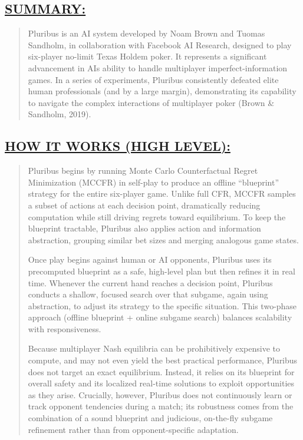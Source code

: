 \documentclass[
]{article}
\begin{document}
\subsection*{\texorpdfstring{\textbf{\ul{SUMMARY:}}}{SUMMARY:}}\label{summary-1}

\begin{quote}
Pluribus is an AI system developed by Noam Brown and Tuomas Sandholm, in
collaboration with Facebook AI Research, designed to play six-player
no-limit Texas Hold\textquotesingle em poker. It represents a
significant advancement in AI\textquotesingle s ability to handle
multiplayer imperfect-information games. In a series of experiments,
Pluribus consistently defeated elite human professionals (and by a large
margin), demonstrating its capability to navigate the complex
interactions of multiplayer poker (Brown \& Sandholm, 2019).
\end{quote}

\subsection*{\texorpdfstring{\textbf{\ul{HOW IT WORKS (HIGH
LEVEL):}}}{HOW IT WORKS (HIGH LEVEL):}}\label{how-it-works-high-level-1}

\begin{quote}
Pluribus begins by running Monte Carlo Counterfactual Regret
Minimization (MCCFR) in self-play to produce an offline ``blueprint''
strategy for the entire six-player game. Unlike full CFR, MCCFR samples
a subset of actions at each decision point, dramatically reducing
computation while still driving regrets toward equilibrium. To keep the
blueprint tractable, Pluribus also applies action and information
abstraction, grouping similar bet sizes and merging analogous game
states.

Once play begins against human or AI opponents, Pluribus uses its
precomputed blueprint as a safe, high-level plan but then refines it in
real time. Whenever the current hand reaches a decision point, Pluribus
conducts a shallow, focused search over that subgame, again using
abstraction, to adjust its strategy to the specific situation. This
two-phase approach (offline blueprint + online subgame search) balances
scalability with responsiveness.

Because multiplayer Nash equilibria can be prohibitively expensive to
compute, and may not even yield the best practical performance, Pluribus
does not target an exact equilibrium. Instead, it relies on its
blueprint for overall safety and its localized real-time solutions to
exploit opportunities as they arise. Crucially, however, Pluribus does
not continuously learn or track opponent tendencies during a match; its
robustness comes from the combination of a sound blueprint and
judicious, on-the-fly subgame refinement rather than from
opponent-specific adaptation.
\end{quote}
\end{document}
